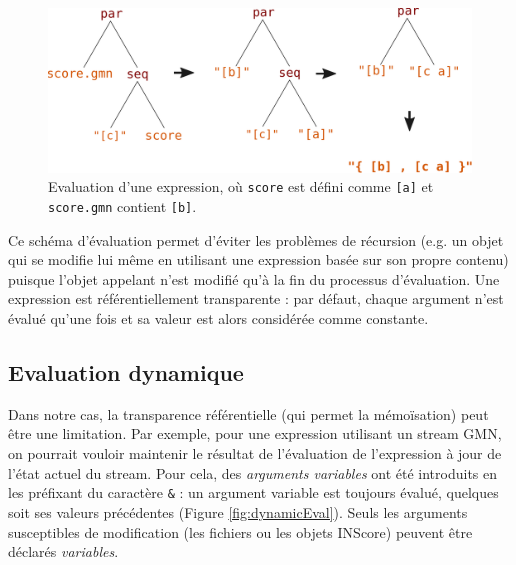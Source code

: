 \documentclass{article}
\newcommand{\OSC}[1]	{{\fontsize{10pt}{10pt} \selectfont\texttt{#1}}}
\begin{document}
\begin{figure}[th]
\centering
\includegraphics[width=1\columnwidth]{imgs/classicEval}
\caption{Evaluation d'une expression,
où \OSC{score} est défini comme \OSC{[a]}
et \OSC{score.gmn} contient \OSC{[b]}.
\label{fig:classicEval} }
\end{figure}

Ce schéma d'évaluation permet d'éviter les problèmes de récursion (e.g. un objet qui se modifie lui même en utilisant une expression basée sur son propre contenu) puisque l'objet appelant n'est modifié qu'à la fin du processus d'évaluation. 
Une expression est référentiellement transparente : par défaut, chaque argument n'est évalué qu'une fois et sa valeur est alors considérée comme constante.


\subsection{Evaluation dynamique}

Dans notre cas, la transparence référentielle (qui permet la mémoïsation) peut être une limitation. Par exemple, pour une expression utilisant un stream GMN, on pourrait vouloir maintenir le résultat de l'évaluation de l'expression à jour de l'état actuel du stream. Pour cela, des \emph{arguments variables} ont été introduits en les préfixant du caractère \OSC{\&} : un argument variable est toujours évalué, quelques soit ses valeurs précédentes (Figure \ref{fig:dynamicEval}). Seuls les arguments susceptibles de modification (les fichiers ou les objets INScore) peuvent être déclarés \emph{variables}.
\end{document}
